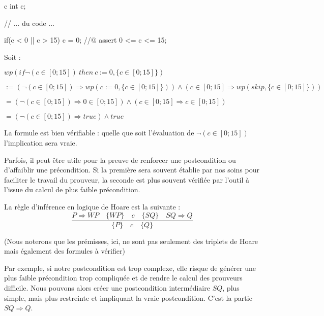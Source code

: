 \begin{CodeBlock}{c}
int c;

// ... du code ...

if(c < 0 || c > 15){
  c = 0;
}
//@ assert 0 <= c <= 15;
\end{CodeBlock}



Soit :



$wp(if \neg (c \in [0;15])\ then\ c := 0, \{c \in [0;15]\})$



$:= (\neg (c \in [0;15])\Rightarrow wp(c := 0, \{c \in [0;15]\})) \wedge (c \in [0;15]\Rightarrow wp(skip, \{c \in [0;15]\}))$



$= (\neg (c \in [0;15]) \Rightarrow 0 \in [0;15]) \wedge (c \in [0;15] \Rightarrow c \in [0;15])$



$= (\neg (c \in [0;15]) \Rightarrow true) \wedge true$



La formule est bien vérifiable : quelle que soit l'évaluation de $\neg (c \in [0;15])$ l'implication sera vraie.


\label{l3:statements-basic-consequence}



Parfois, il peut être utile pour la preuve de renforcer une postcondition ou 
d'affaiblir une précondition. Si la première sera souvent établie par nos soins
pour faciliter le travail du prouveur, la seconde est plus souvent vérifiée 
par l'outil à l'issue du calcul de plus faible précondition.



La règle d'inférence en logique de Hoare est la suivante :
$$\dfrac{P \Rightarrow WP \quad \{WP\}\quad c\quad \{SQ\} \quad SQ \Rightarrow Q}{\{P\}\quad c \quad \{Q\}}$$



(Nous noterons que les prémisses, ici, ne sont pas seulement des triplets de
Hoare mais également des formules à vérifier)



Par exemple, si notre postcondition est trop complexe, elle risque de générer
une plus faible précondition trop compliquée et de rendre le calcul des 
prouveurs difficile. Nous pouvons alors créer une postcondition intermédiaire
$SQ$, plus simple, mais plus restreinte et impliquant la vraie postcondition. 
C'est la partie $SQ \Rightarrow Q$.



